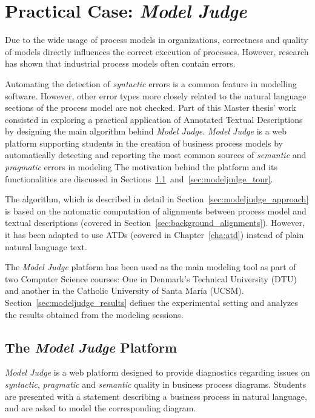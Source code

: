 \chapter{Practical Case: \emph{Model Judge}}
\label{cha:modeljudge}

Due to the wide usage of process models in organizations, correctness and
quality of models directly influences the correct execution of processes.
However, research has shown that industrial process models often
contain errors\cite{citation needed}.

Automating the detection of \emph{syntactic} errors is a common feature in 
modelling software. However, other error types more closely related to the
natural language sections of the process model are not checked. Part of this
Master thesis' work consisted in exploring a practical application of Annotated
Textual Descriptions by designing the main algorithm behind \emph{Model
  Judge}\cite{citation needed}. \emph{Model Judge} is a web platform supporting
students in the creation of business process models by automatically detecting
and reporting the most common sources of \emph{semantic} and \emph{pragmatic}
errors in modeling The motivation behind the platform and its functionalities
are discussed in
Sections~\ref{sec:modeljudge_description}~and~\ref{sec:modeljudge_tour}.


The algorithm, which is described in detail in
Section~\ref{sec:modeljudge_approach} is based on the automatic computation of
alignments between process model and textual descriptions (covered in
Section~\ref{sec:background_alignments}). However, it has been adapted to use
ATDs (covered in Chapter~\ref{cha:atd}) instead of plain natural language text.

The \emph{Model Judge} platform has been used as the main modeling tool as
part of two Computer Science courses: One in Denmark's Technical University
(DTU) and another in the Catholic University of Santa Mar\'ia (UCSM).
Section~\ref{sec:modeljudge_results} defines the experimental setting and
analyzes the results obtained from the modeling sessions.

\section{The \emph{Model Judge} Platform}
\label{sec:modeljudge_description}
 


\emph{Model Judge} is a web platform designed to provide diagnostics regarding
issues on \emph{syntactic}, \emph{pragmatic} and \emph{semantic} quality in
business process diagrams. Students are presented with a statement describing a
business process in natural language, and are asked to model the corresponding
diagram.

